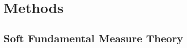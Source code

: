 \documentclass[letterpaper,twocolumn,amsmath,amssymb,prb]{revtex4-1}
\begin{document}

%

 
\section{Methods}

\subsection{Soft Fundamental Measure Theory}
\end{document}
